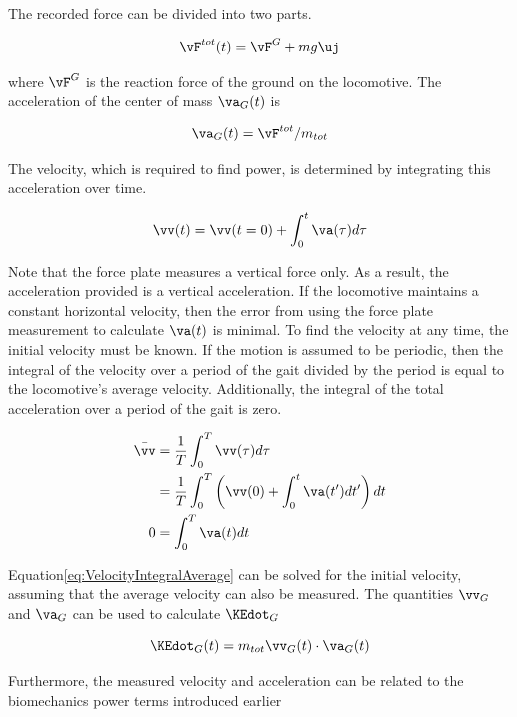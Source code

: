 The recorded force can be divided into two parts.

\begin{equation}
\vF^{tot}(t) = \vF^{G} + mg \uj
\end{equation}

where $\vF^{G}$ is the reaction force of the ground on the locomotive. The acceleration of the center of mass $\va_{G}(t)$ is

\begin{equation}
\va_{G}(t) = \vF^{tot}/m_{tot}
\end{equation}

The velocity, which is required to find power, is determined by integrating this acceleration over time.

\begin{equation}
\vv(t) = \vv(t=0) + \int_{0}^{t} \va(\tau) d\tau
\label{eq:VelocityIntegral}
\end{equation}

Note that the force plate measures a vertical force only. As a result, the acceleration provided is a vertical acceleration. If the locomotive maintains a constant horizontal velocity, then the error from using the force plate measurement to calculate $\va(t)$ is minimal. To find the velocity at any time, the initial velocity must be known. If the motion is assumed to be periodic, then the integral of the velocity over a period of the gait divided by the period is equal to the locomotive's average velocity. Additionally, the integral of the total acceleration over a period of the gait is zero.

\begin{align}
\bar{\vv} &= \frac{1}{T}\int_{0}^{T} \vv(\tau)d\tau \notag \\
&= \frac{1}{T} \int_0^{T} \left( \vv(0) + \int_{0}^{t} \va(t') dt' \right) dt \\
0 &= \int_{0}^{T} \va(t)dt
\label{eq:VelocityIntegralAverage}
\end{align}

Equation\ref{eq:VelocityIntegralAverage} can be solved for the initial velocity, assuming that the average velocity can also be measured. The quantities $\vv_{G}$ and $\va_{G}$ can be used to calculate $\KEdot_{G}$

\begin{equation}
\KEdot_{G}(t) = m_{tot} \vv_{G}(t) \cdot \va_{G}(t)
\end{equation}

Furthermore, the measured velocity and acceleration can be related to the biomechanics power terms introduced earlier

